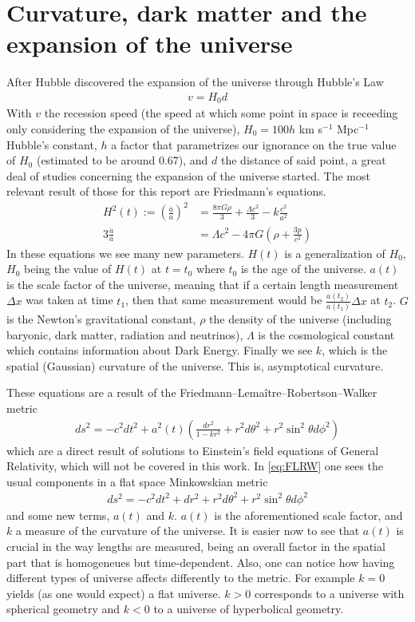\section{Curvature, dark matter and the expansion of the universe}
After Hubble discovered the expansion of the universe through Hubble's Law\cite{Hubble1929}
\begin{align}
	v = H_0 d
	\label{eq:ley-hubble}
\end{align}
With $v$ the recession speed (the speed at which some point in space is receeding only considering the expansion of the universe), $H_0=100h$ km s$^{-1}$ Mpc$^{-1}$ Hubble's constant, $h$ a factor that parametrizes our ignorance on the true value of $H_0$ (estimated to be around $0.67$), and $d$ the distance of said point, a great deal of studies concerning the expansion of the universe started. The most relevant result of those for this report are Friedmann's equations.
\begin{align}
	H^2(t) := \left(\frac{\dot a}{a}\right)^2 &=  \frac{8\pi G \rho}{3} +\frac{\Lambda c^2}{3} - k \frac{c^2}{a^2}
	\label{eq:1a-friedmann}\\
	3 \frac{\ddot a}{a} &= \Lambda c^2 - 4\pi G \left( \rho + \frac{3p}{c^2} \right) 
	\label{eq:2a-friedmann}
\end{align}
In these equations we see many new parameters. $H(t)$ is a generalization of $H_0$, $H_0$ being the value of $H(t)$ at $t=t_0$ where $t_0$ is the age of the universe. $a(t)$ is the scale factor of the universe, meaning that if a certain length measurement $\Delta x$ was taken at time $t_1$, then that same measurement would be $\frac{a(t_2)}{a(t_1)}\Delta x$ at $t_2$. $G$ is the Newton's gravitational constant, $\rho$ the density of the universe (including baryonic, dark matter, radiation and neutrinos), $\Lambda$ is the cosmological constant which contains information about Dark Energy. Finally we see $k$, which is the spatial (Gaussian) curvature of the universe. This is, asymptotical curvature.

These equations are a result of the Friedmann–Lemaître–Robertson–Walker metric 
\begin{align}
	ds ^2 = -c^2 dt^2  + a^2(t) \left( \frac{dr^2}{1-kr^2} +r^2d\theta ^2 + r^2 \sin^2\theta d\phi^2\right) 
	\label{eq:FLRW}
\end{align}which are a direct result of solutions to Einstein's field equations of General Relativity, which will not be covered in this work. In \eqref{eq:FLRW} one sees the usual components in a flat space Minkowskian metric 
\begin{align}
	ds^2 = -c^2dt^2 + dr^2 + r^2d\theta^2 + r^2 \sin^2\theta d\phi^2
\end{align} and some new terms, $a(t)$ and $k$. $a(t)$ is the aforementioned scale factor, and $k$ a measure of the curvature of the universe. It is easier now to see that $a(t)$ is crucial in the way lengths are measured, being an overall factor in the spatial part that is homogeneues but time-dependent. Also, one can notice how having different types of universe affects differently to the metric. For example $k=0$ yields (as one would expect) a flat universe. $k>0$ corresponds to a universe with spherical geometry and $k<0$ to a universe of hyperbolical geometry.

